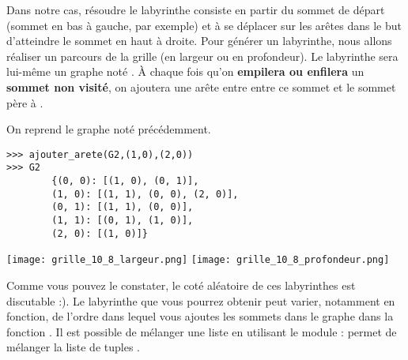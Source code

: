 Dans notre cas, résoudre le labyrinthe consiste en partir du sommet de départ  (sommet en bas à gauche, par exemple) et à se déplacer sur les arêtes dans le but d'atteindre le sommet en haut à droite. 
Pour générer un labyrinthe, nous allons réaliser un parcours de la grille  (en largeur ou en profondeur). Le labyrinthe sera lui-même un graphe noté . À chaque fois qu'on \textbf{empilera ou enfilera} un \textbf{sommet non visité}, on ajoutera une arête entre entre ce sommet et le sommet père à . 




\begin{exemple}
On reprend le graphe noté  précédemment. 
\begin{lstlisting}
>>> ajouter_arete(G2,(1,0),(2,0))
>>> G2
        {(0, 0): [(1, 0), (0, 1)],
        (1, 0): [(1, 1), (0, 0), (2, 0)],
        (0, 1): [(1, 1), (0, 0)],
        (1, 1): [(0, 1), (1, 0)],
        (2, 0): [(1, 0)]}
\end{lstlisting}
\end{exemple}





\begin{center}
\texttt{[image: grille\_10\_8\_largeur.png]}
\texttt{[image: grille\_10\_8\_profondeur.png]}
\end{center}


Comme vous pouvez le constater, le coté aléatoire de ces labyrinthes est discutable :). Le labyrinthe que vous pourrez obtenir peut varier, notamment en fonction, de l'ordre dans lequel vous ajoutes les sommets dans le graphe dans la fonction . 
Il est possible de mélanger une liste en utilisant le module  :  permet de mélanger la liste de tuples .

